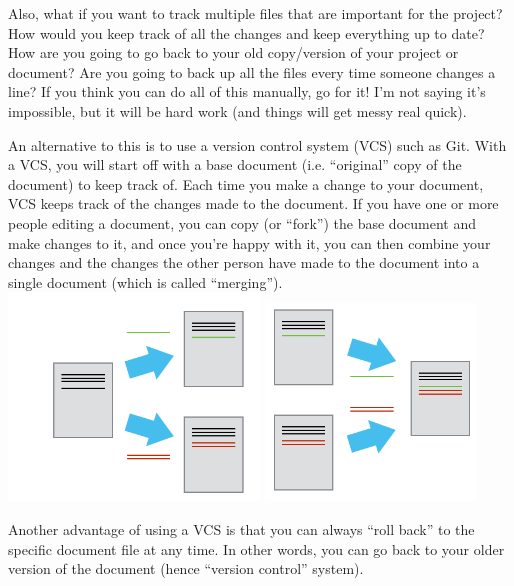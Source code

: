 \documentclass[a4paper, 12pt]{article}
\begin{document}
Also, what if you want to track multiple files that are important for the project?
How would you keep track of all the changes and keep everything up to date?
How are you going to go back to your old copy/version of your project or document?
Are you going to back up all the files every time someone changes a line?
If you think you can do all of this manually, go for it!
I'm not saying it's impossible, but it will be hard work (and things will get messy real quick).

An alternative to this is to use a version control system (VCS) such as Git.
With a VCS, you will start off with a base document (i.e. ``original'' copy of the document) to keep track of.
Each time you make a change to your document, VCS keeps track of the changes made to the document.
If you have one or more people editing a document, you can copy (or ``fork'') the base document and make changes to it, and once you're happy with it, you can then combine your changes and the changes the other person have made to the document into a single document (which is called ``merging'').\\
\includegraphics[width=0.5\textwidth]{./images/versions}
\includegraphics[width=0.42\textwidth]{./images/merge}

Another advantage of using  a VCS is that you can always ``roll back'' to the specific document file at any time.
In other words, you can go back to your older version of the document (hence ``version control'' system).
\end{document}
